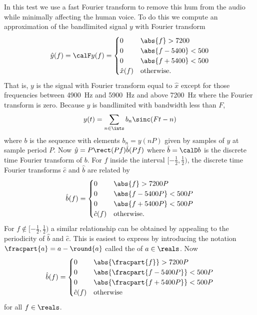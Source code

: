\begin{test}
In this test we use a fast Fourier transform to remove this hum from the audio while minimally affecting the human voice.  To do this we compute an approximation of the bandlimited signal $y$ with Fourier transform
\[
\hat{y}(f) = \calF y(f) = \begin{cases}
0 & \abs{f} > 7200 \\
0 & \abs{f-5400} < 500 \\
0 & \abs{f+5400} < 500 \\
\hat{x}(f) & \text{otherwise}.
\end{cases}
\]
That is, $y$ is the signal with Fourier transform equal to $\hat{x}$ except for those frequencies between \SI{4900}{\hertz} and \SI{5900}{\hertz} and above \SI{7200}{\hertz} where the Fourier transform is zero.  Because $y$ is bandlimited with bandwidth less than $F$,
\[
y(t) = \sum_{n \in \ints} b_n \sinc(Ft - n)
\]
where $b$ is the sequence with elements $b_n = y(nP)$ given by samples of $y$ at sample period $P$.  Now $\hat{y} = P \rect(Pf) \hat{b}(Pf)$ where $\hat{b}=\calD b$ is the discrete time Fourier transform of $b$.  For $f$ inside the interval $[-\tfrac{1}{2},\tfrac{1}{2})$, the discrete time Fourier transforms $\hat{c}$ and $\hat{b}$ are related by
\[
\hat{b}(f) = \begin{cases}
0 & \abs{f} > 7200P \\
0 & \abs{f-5400P} < 500P \\
0 & \abs{f+5400P} < 500P \\
\hat{c}(f) & \text{otherwise}.
\end{cases}
\]
For $f \notin [-\tfrac{1}{2},\tfrac{1}{2})$ a similar relationship can be obtained by appealing to the periodicity of $\hat{b}$ and $\hat{c}$.  This is easiest to express by introducing the notation $\fracpart{a} = a - \round{a}$ called the  of $a \in \reals$.  Now
\[
\hat{b}(f) = \begin{cases}
0 & \abs{\fracpart{f}} > 7200P \\
0 & \abs{\fracpart{f-5400P}} < 500P \\
0 & \abs{\fracpart{f+5400P}} < 500P \\
\hat{c}(f) & \text{otherwise}
\end{cases}
\]
for all $f \in \reals$.


\end{test}
